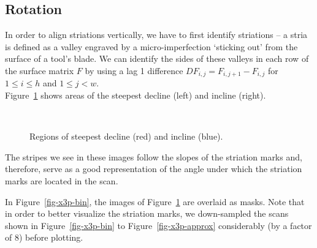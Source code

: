 \documentclass[
  authoryear,
  preprint,
  5p,
  twocolumn]{elsarticle}
\begin{document}
\subsection{Rotation}\label{sec-Rotation}

In order to align striations vertically, we have to first identify
striations -- a stria is defined as a valley engraved by a
micro-imperfection `sticking out' from the surface of a tool's blade. We
can identify the sides of these valleys in each row of the surface
matrix \(F\) by using a lag 1 difference
\(DF_{i,j} = F_{i, j+1} - F_{i, j}\) for \(1 \le i \le h\) and
\(1 \le j < w\).\\
Figure~\ref{fig-x3p-bins} shows areas of the steepest decline (left) and
incline (right).

\begin{figure}

\begin{minipage}{0.48\linewidth}



\end{minipage}%
%
\begin{minipage}{0.04\linewidth}
~\end{minipage}%
%
\begin{minipage}{0.48\linewidth}



\end{minipage}%

\caption{\label{fig-x3p-bins}Regions of steepest decline (red) and
incline (blue).}

\end{figure}%

The stripes we see in these images follow the slopes of the striation
marks and, therefore, serve as a good representation of the angle under
which the striation marks are located in the scan.

In Figure~\ref{fig-x3p-bin}, the images of Figure~\ref{fig-x3p-bins} are
overlaid as masks. Note that in order to better visualize the striation
marks, we down-sampled the scans shown in Figure~\ref{fig-x3p-bin} to
Figure~\ref{fig-x3p-approx} considerably (by a factor of 8) before
plotting.
\end{document}
